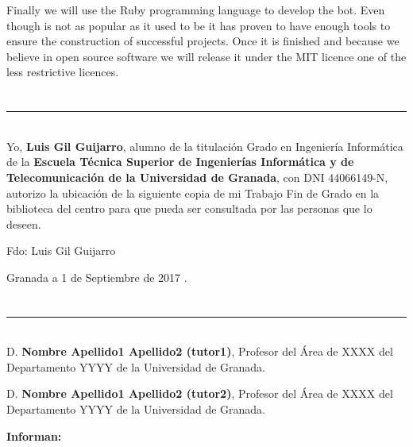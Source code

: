 Finally we will use the Ruby programming language to develop the bot. Even though is not as popular as it used to be it has proven to have enough tools to ensure the construction of successful projects. Once it is finished and  because we believe in open source software we will release it under the MIT licence one of the less restrictive licences. 


\chapter*{}
\thispagestyle{empty}

\noindent\rule[-1ex]{\textwidth}{2pt}\\[4.5ex]

Yo, \textbf{Luis Gil Guijarro}, alumno de la titulación Grado en Ingeniería Informática de la \textbf{Escuela Técnica Superior
de Ingenierías Informática y de Telecomunicación de la Universidad de Granada}, con DNI 44066149-N, autorizo la
ubicación de la siguiente copia de mi Trabajo Fin de Grado en la biblioteca del centro para que pueda ser
consultada por las personas que lo deseen.

\vspace{6cm}

\noindent Fdo: Luis Gil Guijarro

\vspace{2cm}

\begin{flushright}
Granada a 1 de Septiembre de 2017 .
\end{flushright}


\chapter*{}
\thispagestyle{empty}

\noindent\rule[-1ex]{\textwidth}{2pt}\\[4.5ex]

D. \textbf{Nombre Apellido1 Apellido2 (tutor1)}, Profesor del Área de XXXX del Departamento YYYY de la Universidad de Granada.

\vspace{0.5cm}

D. \textbf{Nombre Apellido1 Apellido2 (tutor2)}, Profesor del Área de XXXX del Departamento YYYY de la Universidad de Granada.


\vspace{0.5cm}

\textbf{Informan:}

\vspace{0.5cm}

